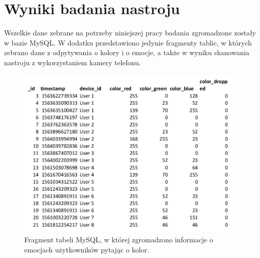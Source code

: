 \chapter{Wyniki badania nastroju}
\label{cha:wynikiBadaniaNastroju}

Wszelkie dane zebrane na potrzeby niniejszej pracy badania zgromadzone zostały w bazie MySQL. W dodatku przedstawiono jedynie fragmenty tablic, w których zebrano dane z odpytywania o kolory i o emocje, a także w wyniku skanowania nastroju z wykorzystaniem kamery telefonu.

\begin{figure}[H]
	\centering
	\includegraphics[scale=0.9]{dodatekB/Color.png}
	\caption{Fragment tabeli MySQL, w której zgromadzono informacje o emocjach użytkowników pytając o kolor.}
\end{figure}
\clearpage

